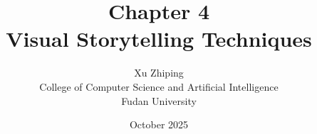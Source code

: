 \documentclass[11pt,letterpaper]{book}
\begin{document}
\title{Chapter 4\\
\large Visual Storytelling Techniques}
\author{Xu Zhiping\\
\small College of Computer Science and Artificial Intelligence\\
\small Fudan University}
\date{October 2025}
\maketitle

\tableofcontents

\setcounter{chapter}{3}




\printindex
\end{document}
